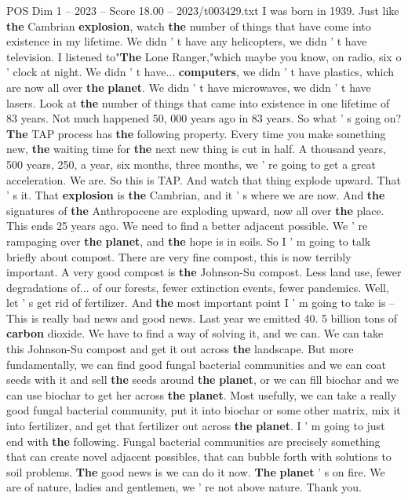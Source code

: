 \begin{textsample}{POS Dim 1 – 2023 – Score 18.00 – 2023/t003429.txt}
I was born in 1939.
Just like \textbf{the} Cambrian \textbf{explosion}, watch \textbf{the} number of things that have come into existence in my lifetime.
We didn ' t have any helicopters, we didn ' t have television.
I listened to"\textbf{The} Lone Ranger,"which maybe you know, on radio, six o ' clock at night.
We didn ' t have... \textbf{computers}, we didn ' t have plastics, which are now all over \textbf{the} \textbf{planet}.
We didn ' t have microwaves, we didn ' t have lasers.
Look at \textbf{the} number of things that came into existence in one lifetime of 83 years.
Not much happened 50, 000 years ago in 83 years.
So what ' s going on? \textbf{The} TAP process has \textbf{the} following property.
Every time you make something new, \textbf{the} waiting time for \textbf{the} next new thing is cut in half.
A thousand years, 500 years, 250, a year, six months, three months, we ' re going to get a great acceleration.
We are.
So this is TAP.
And watch that thing explode upward.
That ' s it.
That \textbf{explosion} is \textbf{the} Cambrian, and it ' s where we are now.
And \textbf{the} signatures of \textbf{the} Anthropocene are exploding upward, now all over \textbf{the} place.
This ends 25 years ago.
We need to find a better adjacent possible.
We ' re rampaging over \textbf{the} \textbf{planet}, and \textbf{the} hope is in soils.
So I ' m going to talk briefly about compost.
There are very fine compost, this is now terribly important.
A very good compost is \textbf{the} Johnson-Su compost.
Less land use, fewer degradations of... of our forests, fewer extinction events, fewer pandemics.
Well, let ' s get rid of fertilizer.
And \textbf{the} most important point I ' m going to take is -- This is really bad news and good news.
Last year we emitted 40. 5 billion tons of \textbf{carbon} dioxide.
We have to find a way of solving it, and we can.
We can take this Johnson-Su compost and get it out across \textbf{the} landscape.
But more fundamentally, we can find good fungal bacterial communities and we can coat seeds with it and sell \textbf{the} seeds around \textbf{the} \textbf{planet}, or we can fill biochar and we can use biochar to get her across \textbf{the} \textbf{planet}.
Most usefully, we can take a really good fungal bacterial community, put it into biochar or some other matrix, mix it into fertilizer, and get that fertilizer out across \textbf{the} \textbf{planet}.
I ' m going to just end with \textbf{the} following.
Fungal bacterial communities are precisely something that can create novel adjacent possibles, that can bubble forth with solutions to soil problems. \textbf{The} good news is we can do it now. \textbf{The} \textbf{planet} ' s on fire.
We are of nature, ladies and gentlemen, we ' re not above nature.
Thank you.

\end{textsample}
